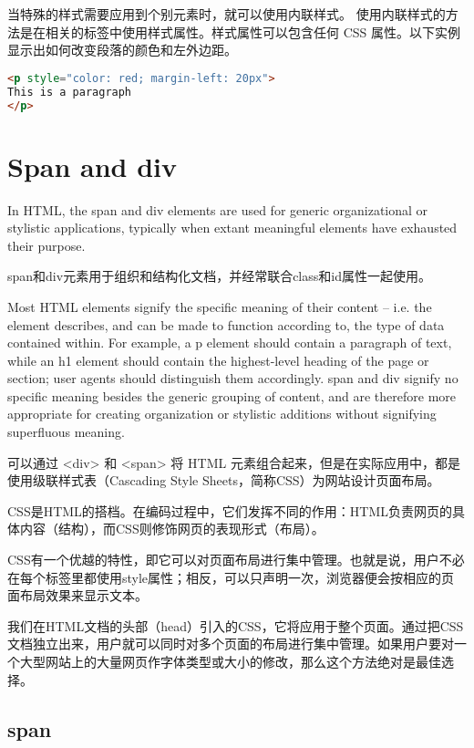 当特殊的样式需要应用到个别元素时，就可以使用内联样式。 使用内联样式的方法是在相关的标签中使用样式属性。样式属性可以包含任何 CSS 属性。以下实例显示出如何改变段落的颜色和左外边距。

\begin{lstlisting}[language=HTML]
<p style="color: red; margin-left: 20px">
This is a paragraph
</p>
\end{lstlisting}




\chapter{Span and div}


In HTML, the span and div elements are used for generic organizational or stylistic applications, typically when extant meaningful elements have exhausted their purpose.


span和div元素用于组织和结构化文档，并经常联合class和id属性一起使用。


Most HTML elements signify the specific meaning of their content – i.e. the element describes, and can be made to function according to, the type of data contained within. For example, a p element should contain a paragraph of text, while an h1 element should contain the highest-level heading of the page or section; user agents should distinguish them accordingly. span and div signify no specific meaning besides the generic grouping of content, and are therefore more appropriate for creating organization or stylistic additions without signifying superfluous meaning.

可以通过 <div> 和 <span> 将 HTML 元素组合起来，但是在实际应用中，都是使用级联样式表（Cascading Style Sheets，简称CSS）为网站设计页面布局。

CSS是HTML的搭档。在编码过程中，它们发挥不同的作用：HTML负责网页的具体内容（结构），而CSS则修饰网页的表现形式（布局）。

CSS有一个优越的特性，即它可以对页面布局进行集中管理。也就是说，用户不必在每个标签里都使用style属性；相反，可以只声明一次，浏览器便会按相应的页面布局效果来显示文本。

我们在HTML文档的头部（head）引入的CSS，它将应用于整个页面。通过把CSS文档独立出来，用户就可以同时对多个页面的布局进行集中管理。如果用户要对一个大型网站上的大量网页作字体类型或大小的修改，那么这个方法绝对是最佳选择。

\section{span}

